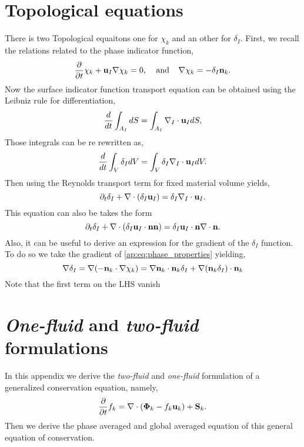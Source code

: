 \section{Topological equations}
There is two Topological equaitons one for $\chi_k$ and an other for $\delta_I$.
First, we recall the relations related to the phase indicator function, 
\begin{equation}
    \frac{\partial}{\partial t} \chi_k
    + \textbf{u}_I  \mathbf{\nabla} \chi_k 
    = 0, \;\;\;\;\text{and}\;\;\;\; 
    \mathbf{\nabla} \chi_k 
    = - \delta_I \textbf{n}_k.
    \label{ap:eq:phase_properties}
\end{equation}
Now the surface indicator function transport equation can be obtained using the Leibniz rule for differentiation,  
\begin{equation*}
    \frac{d}{d t} \int_{A_I} dS
    = \int_{A_I} \mathbf{\nabla}_I \cdot \textbf{u}_I dS,
\end{equation*}
Those integrals can be re rewritten as, 
\begin{equation*}
    \frac{d}{d t} \int_{V} \delta_I dV
    = \int_{V} \delta_I \mathbf{\nabla}_I \cdot \textbf{u}_I dV.
\end{equation*}
Then using the Reynolds transport term for fixed material volume yields,
\begin{equation*}
    \partial_t \delta_I
    + \mathbf{\nabla} \cdot (\delta_I \textbf{u}_I)
    = \delta_I \mathbf{\nabla}_I \cdot \textbf{u}_I. 
\end{equation*}
This equation can also be takes the form 
\begin{equation}
    \partial_t \delta_I
    + \mathbf{\nabla} \cdot (\delta_I \textbf{u}_I\cdot \textbf{n}\textbf{n})
    = \delta_I \textbf{u}_I \cdot \textbf{n}\mathbf{\nabla} \cdot \textbf{n}. 
    \label{ap:eq:dt_delta_I}
\end{equation}
Also, it can be useful to derive an expression for the gradient of the $\delta_I$ function. 
To do so we take the gradient of \ref{ap:eq:phase_properties} yielding, 
\begin{equation*}
    \mathbf{\nabla}\delta_I 
    = \mathbf{\nabla}( - \textbf{n}_k \cdot \mathbf{\nabla} \chi_k)
    = \mathbf{\nabla}\textbf{n}_k \cdot \textbf{n}_k \delta_I
    + \mathbf{\nabla}(\textbf{n}_k \delta_I) \cdot \textbf{n}_k 
\end{equation*}
Note that the first term on the LHS vanish

\section{\textit{One-fluid} and \textit{two-fluid} formulations}
In this appendix we derive the \textit{two-fluid} and \textit{one-fluid} formulation of a generalized conservation equation, namely,
\begin{equation}
    \frac{\partial}{\partial t} f_k
    = \mathbf{\nabla} \cdot (\bm{\Phi}_k - f_k\textbf{u}_k)
    + \textbf{S}_k.
    \label{ap:eq:global_balance}
\end{equation}
Then we derive the phase averaged and global averaged equation of this general equation of conservation. 

